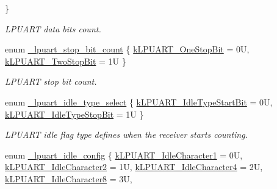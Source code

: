 \begin{DoxyCompactItemize}
 \}
\begin{DoxyCompactList}\small\item\em L\+P\+U\+A\+RT data bits count. \end{DoxyCompactList}\item 
enum \mbox{\hyperlink{group__lpuart__driver_gad19fe7bcda436707337f6d529d5da155}{\+\_\+lpuart\+\_\+stop\+\_\+bit\+\_\+count}} \{ \mbox{\hyperlink{group__lpuart__driver_ggad19fe7bcda436707337f6d529d5da155a4304f0ee73a5fabfadfc05ca1fbd3901}{k\+L\+P\+U\+A\+R\+T\+\_\+\+One\+Stop\+Bit}} = 0U, 
\mbox{\hyperlink{group__lpuart__driver_ggad19fe7bcda436707337f6d529d5da155a6e049e0faaf89ed2dfe493ad8f6c93d4}{k\+L\+P\+U\+A\+R\+T\+\_\+\+Two\+Stop\+Bit}} = 1U
 \}
\begin{DoxyCompactList}\small\item\em L\+P\+U\+A\+RT stop bit count. \end{DoxyCompactList}\item 
enum \mbox{\hyperlink{group__lpuart__driver_ga5f767cb7f8458682f742f2e7d4bda63d}{\+\_\+lpuart\+\_\+idle\+\_\+type\+\_\+select}} \{ \mbox{\hyperlink{group__lpuart__driver_gga5f767cb7f8458682f742f2e7d4bda63da0644f6b95813c520dede56ee3a944267}{k\+L\+P\+U\+A\+R\+T\+\_\+\+Idle\+Type\+Start\+Bit}} = 0U, 
\mbox{\hyperlink{group__lpuart__driver_gga5f767cb7f8458682f742f2e7d4bda63da69545f21a3401c126bf295b5cf94225b}{k\+L\+P\+U\+A\+R\+T\+\_\+\+Idle\+Type\+Stop\+Bit}} = 1U
 \}
\begin{DoxyCompactList}\small\item\em L\+P\+U\+A\+RT idle flag type defines when the receiver starts counting. \end{DoxyCompactList}\item 
enum \mbox{\hyperlink{group__lpuart__driver_ga13c97cefe85629e606de5281d4eef25b}{\+\_\+lpuart\+\_\+idle\+\_\+config}} \{ \newline
\mbox{\hyperlink{group__lpuart__driver_gga13c97cefe85629e606de5281d4eef25ba955e0bb4d3e75e577eef544b440c24be}{k\+L\+P\+U\+A\+R\+T\+\_\+\+Idle\+Character1}} = 0U, 
\mbox{\hyperlink{group__lpuart__driver_gga13c97cefe85629e606de5281d4eef25ba270caa8e77b08697404771af82abd131}{k\+L\+P\+U\+A\+R\+T\+\_\+\+Idle\+Character2}} = 1U, 
\mbox{\hyperlink{group__lpuart__driver_gga13c97cefe85629e606de5281d4eef25bacab443d3d053070635ea1f859b73f34c}{k\+L\+P\+U\+A\+R\+T\+\_\+\+Idle\+Character4}} = 2U, 
\mbox{\hyperlink{group__lpuart__driver_gga13c97cefe85629e606de5281d4eef25baf125ff40887939add6dd0f42d4485bf3}{k\+L\+P\+U\+A\+R\+T\+\_\+\+Idle\+Character8}} = 3U, 
\newline

\end{DoxyCompactItemize}
